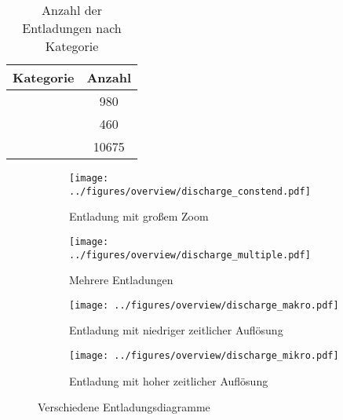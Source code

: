 \begin{table}[H]
\centering
\caption{Anzahl der Entladungen nach Kategorie}
\label{tab:kategorien}
\begin{tabular}{S[table-format=2.1] S[table-format=3.0]}
\toprule
\textbf{Kategorie} & \textbf{Anzahl} \\
\midrule
{}  & 980 \\
  & 460  \\
  & 10675 \\
\bottomrule
\end{tabular}
\end{table}


\begin{figure}[htbp]
    \centering

    \begin{subfigure}[t]{0.47\textwidth}
        \centering
        \texttt{[image: ../figures/overview/discharge\_constend.pdf]}
        \caption{Entladung mit großem Zoom}
        \label{fig:discharge-constend}
    \end{subfigure}
    \hfill
    \begin{subfigure}[t]{0.47\textwidth}
        \centering
        \texttt{[image: ../figures/overview/discharge\_multiple.pdf]}
        \caption{Mehrere Entladungen}
        \label{fig:discharge-multiple}
    \end{subfigure}

    \vspace{0.5cm} %

    \begin{subfigure}[t]{0.47\textwidth}
        \centering
        \texttt{[image: ../figures/overview/discharge\_makro.pdf]}
        \caption{Entladung mit niedriger zeitlicher Auflösung}
        \label{fig:lowres-discharge}
    \end{subfigure}
    \hfill
    \begin{subfigure}[t]{0.47\textwidth}
        \centering
        \texttt{[image: ../figures/overview/discharge\_mikro.pdf]}
        \caption{Entladung mit hoher zeitlicher Auflösung}
        \label{fig:highres-discharge}
    \end{subfigure}

    \caption{Verschiedene Entladungsdiagramme}
    \label{fig:all-discharges-kategories}
\end{figure}
